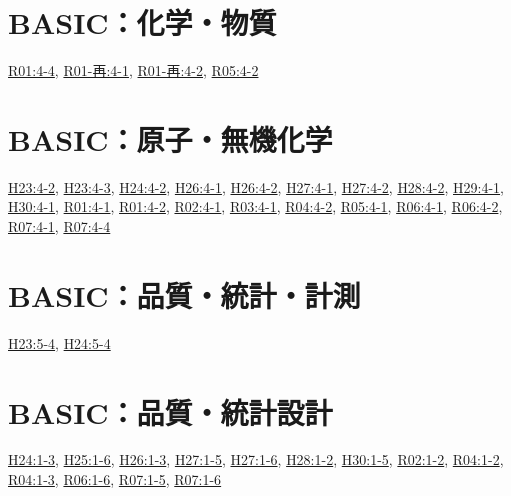 \section{BASIC：化学・物質}
\hyperref[q:r01-reg-basic-4-4]{R01:4-4}, \hyperref[q:r01-ret-basic-4-1]{R01-再:4-1}, \hyperref[q:r01-ret-basic-4-2]{R01-再:4-2}, \hyperref[q:r05-reg-basic-4-2]{R05:4-2}
\section{BASIC：原子・無機化学}
\hyperref[q:h23-reg-basic-4-2]{H23:4-2}, \hyperref[q:h23-reg-basic-4-3]{H23:4-3}, \hyperref[q:h24-reg-basic-4-2]{H24:4-2}, \hyperref[q:h26-reg-basic-4-1]{H26:4-1}, \hyperref[q:h26-reg-basic-4-2]{H26:4-2}, \hyperref[q:h27-reg-basic-4-1]{H27:4-1}, \hyperref[q:h27-reg-basic-4-2]{H27:4-2}, \hyperref[q:h28-reg-basic-4-2]{H28:4-2}, \hyperref[q:h29-reg-basic-4-1]{H29:4-1}, \hyperref[q:h30-reg-basic-4-1]{H30:4-1}, \hyperref[q:r01-reg-basic-4-1]{R01:4-1}, \hyperref[q:r01-reg-basic-4-2]{R01:4-2}, \hyperref[q:r02-reg-basic-4-1]{R02:4-1}, \hyperref[q:r03-reg-basic-4-1]{R03:4-1}, \hyperref[q:r04-reg-basic-4-2]{R04:4-2}, \hyperref[q:r05-reg-basic-4-1]{R05:4-1}, \hyperref[q:r06-reg-basic-4-1]{R06:4-1}, \hyperref[q:r06-reg-basic-4-2]{R06:4-2}, \hyperref[q:r07-reg-basic-4-1]{R07:4-1}, \hyperref[q:r07-reg-basic-4-4]{R07:4-4}
\section{BASIC：品質・統計・計測}
\hyperref[q:h23-reg-basic-5-4]{H23:5-4}, \hyperref[q:h24-reg-basic-5-4]{H24:5-4}
\section{BASIC：品質・統計設計}
\hyperref[q:h24-reg-basic-1-3]{H24:1-3}, \hyperref[q:h25-reg-basic-1-6]{H25:1-6}, \hyperref[q:h26-reg-basic-1-3]{H26:1-3}, \hyperref[q:h27-reg-basic-1-5]{H27:1-5}, \hyperref[q:h27-reg-basic-1-6]{H27:1-6}, \hyperref[q:h28-reg-basic-1-2]{H28:1-2}, \hyperref[q:h30-reg-basic-1-5]{H30:1-5}, \hyperref[q:r02-reg-basic-1-2]{R02:1-2}, \hyperref[q:r04-reg-basic-1-2]{R04:1-2}, \hyperref[q:r04-reg-basic-1-3]{R04:1-3}, \hyperref[q:r06-reg-basic-1-6]{R06:1-6}, \hyperref[q:r07-reg-basic-1-5]{R07:1-5}, \hyperref[q:r07-reg-basic-1-6]{R07:1-6}
